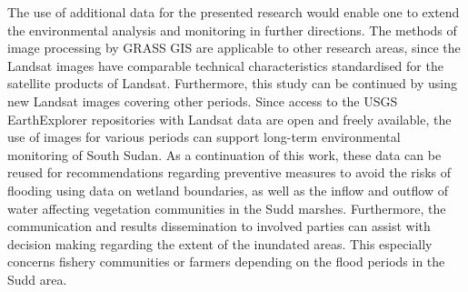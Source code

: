 \documentclass[analytics,article,accept,pdftex,moreauthors]{Definitions/mdpi}
\begin{document}
The use of additional data for the presented research would enable one to extend the environmental analysis and monitoring in further directions. {The methods of image processing by GRASS GIS are applicable to other research areas, since the Landsat images have comparable technical characteristics standardised for the satellite products of Landsat. Furthermore, }this study can be continued by using  new Landsat images covering other periods. Since  access to the USGS EarthExplorer repositories with Landsat data are open and freely available, the use of images for various periods can support long-term environmental monitoring of South Sudan. {As} a continuation of this work, these data can be reused for recommendations regarding  preventive measures to avoid the risks of flooding using data on wetland boundaries, as well as the inflow and outflow of water affecting vegetation communities in the Sudd marshes. Furthermore, the communication and results dissemination to involved parties can assist with decision making regarding the extent of the inundated areas. This especially concerns fishery communities or farmers depending on the flood periods in the Sudd area. 



\vspace{6pt}  




\end{document}
